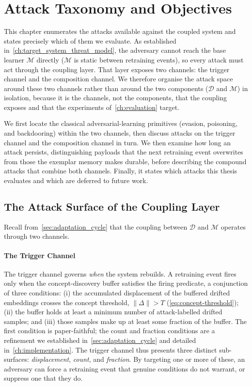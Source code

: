 \chapter{Attack Taxonomy and Objectives}
\label{ch:attack_taxonomy_objectives}

This chapter enumerates the attacks available against the coupled system and states precisely which of them we evaluate. As established in~\cref{ch:target_system_threat_model}, the adversary cannot reach the base learner $\mathcal{M}$ directly ($\mathcal{M}$ is static between retraining events), so every attack must act through the coupling layer. That layer exposes two channels: the trigger channel and the composition channel. We therefore organise the attack space around these two channels rather than around the two components ($\mathcal{D}$ and $\mathcal{M}$) in isolation, because it is the channels, not the components, that the coupling exposes and that the experiments of~\cref{ch:evaluation} target.

We first locate the classical adversarial-learning primitives (evasion, poisoning, and backdooring) within the two channels, then discuss attacks on the trigger channel and the composition channel in turn. We then examine how long an attack persists, distinguishing payloads that the next retraining event overwrites from those the exemplar memory makes durable, before describing the compound attacks that combine both channels. Finally, it states which attacks this thesis evaluates and which are deferred to future work.

\section{The Attack Surface of the Coupling Layer}
\label{sec:axt-surface}
Recall from~\cref{sec:adaptation_cycle} that the coupling between $\mathcal{D}$ and $\mathcal{M}$ operates through two channels.

\subsubsection{The Trigger Channel}
The trigger channel governs \emph{when} the system rebuilds. A retraining event fires only when the concept-discovery buffer satisfies the firing predicate, a conjunction of three conditions: (i) the accumulated displacement of the buffered drifted embeddings crosses the concept threshold, $\| \Delta \| > T$ (\cref{eq:concept-threshold}); (ii) the buffer holds at least a minimum number of attack-labelled drifted samples; and (iii) those samples make up at least some fraction of the buffer. The first condition is paper-faithful; the count and fraction conditions are a refinement we established in~\cref{sec:adaptation_cycle} and detailed in~\cref{ch:implementation}. The trigger channel thus presents three distinct sub-surfaces: \emph{displacement}, \emph{count}, and \emph{fraction}. By targeting one or more of these, an adversary can force a retraining event that genuine conditions do not warrant, or suppress one that they do.

